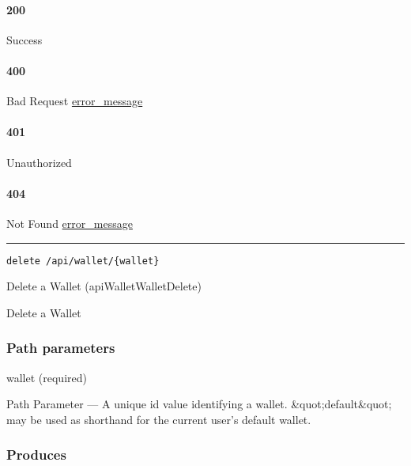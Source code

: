 \hypertarget{section-445}{%
\paragraph{200}\label{section-445}}

Success

\hypertarget{section-446}{%
\paragraph{400}\label{section-446}}

Bad Request \protect\hyperlink{error_message}{error\_message}

\hypertarget{section-447}{%
\paragraph{401}\label{section-447}}

Unauthorized \protect\hyperlink{}{}

\hypertarget{section-448}{%
\paragraph{404}\label{section-448}}

Not Found \protect\hyperlink{error_message}{error\_message}

\begin{center}\rule{0.5\linewidth}{\linethickness}\end{center}

\protect\hypertarget{apiWalletWalletDelete}{}{}

\begin{verbatim}
delete /api/wallet/{wallet}
\end{verbatim}

Delete a Wallet ({apiWalletWalletDelete})

Delete a Wallet

\hypertarget{path-parameters-74}{%
\subsubsection{Path parameters}\label{path-parameters-74}}

wallet (required)

{Path Parameter} --- A unique id value identifying a wallet.
\&quot;default\&quot; may be used as shorthand for the current user's
default wallet.

\hypertarget{produces-135}{%
\subsubsection{Produces}\label{produces-135}}

